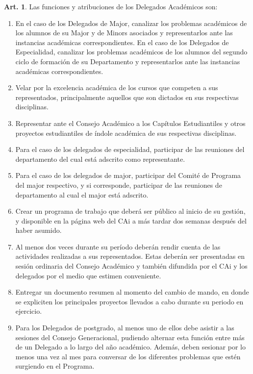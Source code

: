 \documentclass[letterpaper,11pt]{article}
\theoremstyle{definition}%
\newtheorem{art}{Art.} %
\begin{document}
\begin{art}\label{funcionesDelegadosAcademicos}
	Las funciones y atribuciones de los Delegados Académicos son:
	\begin{enumerate}
		\item En el caso de los Delegados de Major, canalizar los problemas académicos de los alumnos de su Major y de Minors asociados y representarlos ante las instancias académicas correspondientes. En el caso de los Delegados de Especialidad, canalizar los problemas académicos de los alumnos del segundo ciclo de formación de su Departamento y representarlos ante las instancias académicas correspondientes.
		\item Velar por la excelencia académica de los cursos que competen a sus representados, principalmente aquellos que son dictados en sus respectivas disciplinas.
		\item Representar ante el Consejo Académico a los Capítulos Estudiantiles y otros proyectos estudiantiles de índole académica de sus respectivas disciplinas.
		\item Para el caso de los delegados de especialidad, participar de las reuniones del departamento del cual está adscrito como representante.
		\item Para el caso de los delegados de major, participar del  Comité de Programa del major respectivo, y si corresponde, participar de las reuniones de departamento al cual el major está adscrito.
		\item Crear un programa de trabajo que deberá ser público al inicio de su gestión, y disponible en la página web del CAi a más tardar dos semanas después del haber asumido.
		\item Al menos dos veces durante su período deberán rendir cuenta de las actividades realizadas a sus representados. Estas deberán ser presentadas en sesión ordinaria del Consejo Académico y también difundida por el CAi  y los delegados por el medio que estimen conveniente.
		\item Entregar un documento resumen al momento del cambio de mando, en donde se expliciten los principales proyectos llevados a cabo durante su periodo en ejercicio.
		\item Para los Delegados de postgrado, al menos uno de ellos debe asistir a las sesiones del Consejo Generacional, pudiendo alternar esta función entre más de un Delegado a lo largo del año académico. Además, deben sesionar por lo menos una vez al mes para conversar de los diferentes problemas que estén surgiendo en el Programa.
	\end{enumerate}
\end{art}
\end{document}
